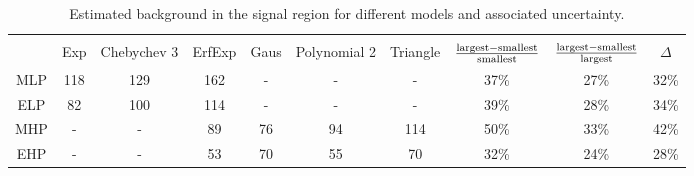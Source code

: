 \begin{landscape}
\begin{table}[p]
\begin{center}
\caption[Estimated background in the signal region for different models.]{Estimated background in the signal region for different models and associated uncertainty.}
\label{tab:bkgtest}
\begin{tabular}{cccccccccc}
\hline\\[-0.3cm]
	       &   Exp    & Chebychev 3  &    ErfExp   &   Gaus   & Polynomial 2 & Triangle & $\frac{\rm largest-smallest}{\rm smallest}$  & $\frac{\rm largest-smallest}{\rm largest}$  & $\Delta$     \\[0.2cm] \hline\hline 
   MLP     &   118    &      129            &    162        &      -       &         -            &       -       &            37\%        &        27\%          &       32\%   \\ 
   ELP     &   82      &       100           &    114        &      -       &         -            &       -       &            39\%         &        28\%          &        34\%    \\ 
   MHP    &   -         &         -             &      89         &    76      &       94           &  114       &            50\%         &        33\%         &        42\%     \\ 
   EHP     &  -          &        -              &      53         &    70     &        55           &    70        &            32\%        &        24\%         &         28\%    \\ \hline
\end{tabular}
\end{center}
\end{table}


\end{landscape}
